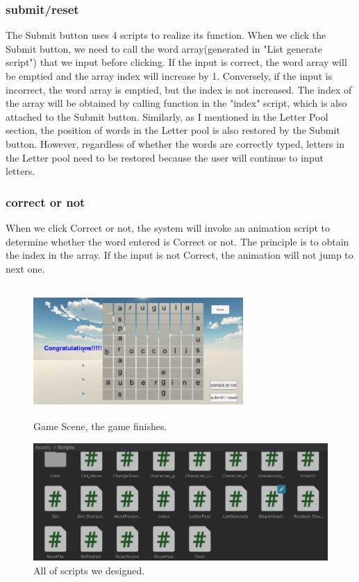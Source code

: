 \documentclass{vgtc}                          %
\begin{document}
\subsubsection{submit/reset}
The Submit button uses 4 scripts to realize its function. When we click the Submit button, we need to call the word array(generated in "List generate script") that we input before clicking. If the input is correct, the word array will be emptied and the array index will increase by 1.  Conversely, if the input is incorrect, the word array is emptied, but the index is not increased.  The index of the array will be obtained by calling function in the "index" script, which is also attached to the Submit button. Similarly, as I mentioned in the Letter Pool section, the position of words in the Letter pool is also restored by the Submit button. However, regardless of whether the words are correctly typed, letters in the Letter pool need to be restored because the user will continue to input letters.
\subsubsection{correct or not}
When we click Correct or not, the system will invoke an animation script to determine whether the word entered is Correct or not\cite{bouvier2019advanced}. The principle is to obtain the index in the array. If the input is not Correct, the animation will not jump to next one.
\begin{figure}[H]
 \centering
 \includegraphics[width=8cm, height=5cm]{pictures/Gamefinish.png}
 \caption{Game Scene, the game finishes.}
 \label{fig:8}
\end{figure}
\begin{figure}[H]
 \centering 
 \includegraphics[width=\columnwidth]{pictures/Scripts.png}
 \caption{All of scripts we designed.}
   \label{fig:scripts}
\end{figure}
\end{document}
